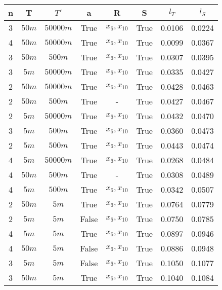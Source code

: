 \begin{tabular}{| c c c | c c c | c c |}
\hline
n & T & $T'$ & a & R & S & $l_T$ & $l_S$ \\
\hline
3 & $50m$ & $50000m$ & True & $x_{6}, x_{10}$ & True & 0.0106 & 0.0224 \\
4 & $50m$ & $50000m$ & True & $x_{6}, x_{10}$ & True & 0.0099 & 0.0367 \\
3 & $50m$ & $500m$ & True & $x_{6}, x_{10}$ & True & 0.0307 & 0.0395 \\
3 & $5m$ & $50000m$ & True & $x_{6}, x_{10}$ & True & 0.0335 & 0.0427 \\
2 & $50m$ & $50000m$ & True & $x_{6}, x_{10}$ & True & 0.0428 & 0.0463 \\
2 & $50m$ & $500m$ & True & - & True & 0.0427 & 0.0467 \\
2 & $5m$ & $50000m$ & True & $x_{6}, x_{10}$ & True & 0.0432 & 0.0470 \\
3 & $5m$ & $500m$ & True & $x_{6}, x_{10}$ & True & 0.0360 & 0.0473 \\
2 & $5m$ & $500m$ & True & $x_{6}, x_{10}$ & True & 0.0443 & 0.0474 \\
4 & $5m$ & $50000m$ & True & $x_{6}, x_{10}$ & True & 0.0268 & 0.0484 \\
4 & $50m$ & $500m$ & True & - & True & 0.0308 & 0.0489 \\
4 & $5m$ & $500m$ & True & $x_{6}, x_{10}$ & True & 0.0342 & 0.0507 \\
2 & $50m$ & $5m$ & True & $x_{6}, x_{10}$ & True & 0.0764 & 0.0779 \\
2 & $5m$ & $5m$ & False & $x_{6}, x_{10}$ & True & 0.0750 & 0.0785 \\
4 & $5m$ & $5m$ & True & $x_{6}, x_{10}$ & True & 0.0897 & 0.0946 \\
4 & $50m$ & $5m$ & False & $x_{6}, x_{10}$ & True & 0.0886 & 0.0948 \\
3 & $5m$ & $5m$ & False & $x_{6}, x_{10}$ & True & 0.1050 & 0.1077 \\
3 & $50m$ & $5m$ & True & $x_{6}, x_{10}$ & True & 0.1040 & 0.1084 \\
\hline
\end{tabular}
